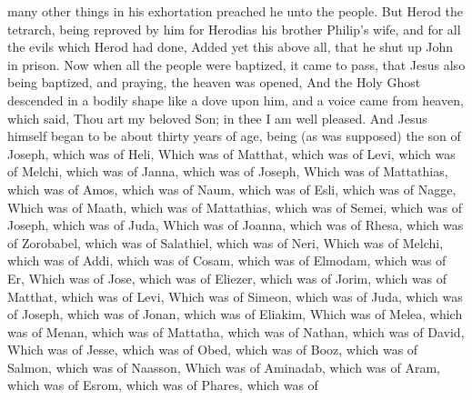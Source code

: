 {many other
things in his
exhortation preached
he unto the
people.
But
Herod the
tetrarch, being
reproved
by
him
for
Herodias
his
brother
Philip’s
wife,
and
for
all the
evils
which
Herod had
done,
Added
yet
this
above
all,
that he shut
up
John
in
prison.
Now
when
all the
people were
baptized, it came to
pass, that
Jesus
also being
baptized,
and
praying, the
heaven was
opened,
And
the
Holy
Ghost
descended in a
bodily
shape
like a
dove
upon
him,
and a
voice
came
from
heaven, which
said,
Thou
art
my
beloved
Son;
in
thee I am well
pleased.
And
Jesus
himself
began to
be
about
thirty years of
age,
being (as was
supposed) the
son of
Joseph, which
was
{} of
Heli,
Which
was
{} of
Matthat, which
was
{} of
Levi, which
was
{} of
Melchi, which
was
{} of
Janna, which
was
{} of
Joseph,
Which
was
{} of
Mattathias, which
was
{} of
Amos, which
was
{} of
Naum, which
was
{} of
Esli, which
was
{} of
Nagge,
Which
was
{} of
Maath, which
was
{} of
Mattathias, which
was
{} of
Semei, which
was
{} of
Joseph, which
was
{} of
Juda,
Which
was
{} of
Joanna, which
was
{} of
Rhesa, which
was
{} of
Zorobabel, which
was
{} of
Salathiel, which
was
{} of
Neri,
Which
was
{} of
Melchi, which
was
{} of
Addi, which
was
{} of
Cosam, which
was
{} of
Elmodam, which
was
{} of
Er,
Which
was
{} of
Jose, which
was
{} of
Eliezer, which
was
{} of
Jorim, which
was
{} of
Matthat, which
was
{} of
Levi,
Which
was
{} of
Simeon, which
was
{} of
Juda, which
was
{} of
Joseph, which
was
{} of
Jonan, which
was
{} of
Eliakim,
Which
was
{} of
Melea, which
was
{} of
Menan, which was
{} of
Mattatha, which
was
{} of
Nathan, which
was
{} of
David,
Which
was
{} of
Jesse, which
was
{} of
Obed, which
was
{} of
Booz, which
was
{} of
Salmon, which
was
{} of
Naasson,
Which
was
{} of
Aminadab, which
was
{} of
Aram, which
was
{} of
Esrom, which
was
{} of
Phares, which
was
{} of
}
